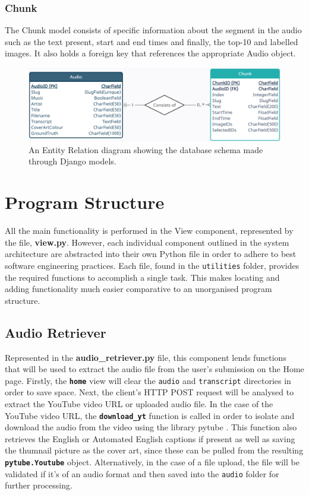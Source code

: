 \documentclass{l4proj}
\begin{document}
\subsubsection{Chunk}
The Chunk model consists of specific information about the segment in the audio such as the text present, start and end times and finally, the top-10 and labelled images. It also holds a foreign key that references the appropriate Audio object.

\begin{figure}
    \centering
    \includegraphics[width=1\textwidth]{figures/models_schema.pdf}
    \caption{An Entity Relation diagram showing the database schema made through Django models.}
    \label{fig:models_schema}
\end{figure}


\section{Program Structure}
All the main functionality is performed in the View component, represented by the file, \textbf{view.py}. However, each individual component outlined in the system architecture are abstracted into their own Python file in order to adhere to best software engineering practices. Each file, found in the \lstinline|utilities| folder, provides the required functions to accomplish a single task. This makes locating and adding functionality much easier comparative to an unorganised program structure.

\subsection{Audio Retriever}
Represented in the \textbf{audio\_retriever.py} file, this component lends functions that will be used to extract the audio file from the user's submission on the Home page. Firstly, the \textbf{\lstinline|home|} view will clear the \lstinline|audio| and \lstinline|transcript| directories in order to save space. Next, the client's HTTP POST request will be analysed to extract the YouTube video URL or uploaded audio file. In the case of the YouTube video URL, the \textbf{\lstinline|download_yt|} function is called in order to isolate and download the audio from the video using the library pytube \citep{pytube}. This function also retrieves the English or Automated English captions if present as well as saving the thumnail picture as the cover art, since these can be pulled from the resulting \textbf{\lstinline|pytube.Youtube|} object. Alternatively, in the case of a file upload, the file will be validated if it's of an audio format and then saved into the \lstinline|audio| folder for further processing.
\end{document}
